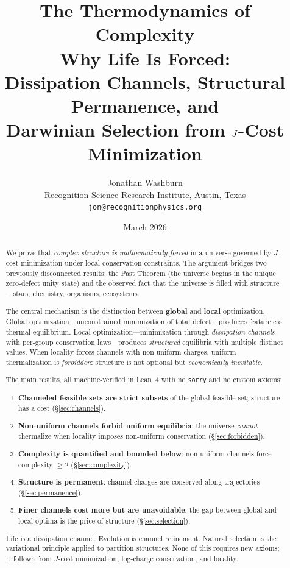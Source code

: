 \documentclass[11pt,a4paper]{article}
\title{\textbf{The Thermodynamics of Complexity}\\[0.3em]
\large Why Life Is Forced:\\
Dissipation Channels, Structural Permanence, and\\
Darwinian Selection from $\Jcost$-Cost Minimization}
\author{Jonathan Washburn\\
\small Recognition Science Research Institute, Austin, Texas\\
\small \texttt{jon@recognitionphysics.org}}
\date{March 2026}
\theoremstyle{plain}
\theoremstyle{definition}
\theoremstyle{remark}
\newcommand{\Jcost}{J}
\begin{document}
\maketitle

\begin{abstract}
We prove that \emph{complex structure is mathematically forced} in a universe governed by $\Jcost$-cost minimization under local conservation constraints.
The argument bridges two previously disconnected results: the Past Theorem (the universe begins in the unique zero-defect unity state) and the observed fact that the universe is filled with structure---stars, chemistry, organisms, ecosystems.

The central mechanism is the distinction between \textbf{global} and \textbf{local} optimization.
Global optimization---unconstrained minimization of total defect---produces featureless thermal equilibrium.
Local optimization---minimization through \emph{dissipation channels} with per-group conservation laws---produces \emph{structured} equilibria with multiple distinct values.
When locality forces channels with non-uniform charges, uniform thermalization is \emph{forbidden}: structure is not optional but \emph{economically inevitable}.

The main results, all machine-verified in Lean~4 with no \texttt{sorry} and no custom axioms:

\begin{enumerate}[nosep]
\item \textbf{Channeled feasible sets are strict subsets} of the global feasible set; structure has a cost (\S\ref{sec:channels}).
\item \textbf{Non-uniform channels forbid uniform equilibria}: the universe \emph{cannot} thermalize when locality imposes non-uniform conservation (\S\ref{sec:forbidden}).
\item \textbf{Complexity is quantified and bounded below}: non-uniform channels force complexity $\ge 2$ (\S\ref{sec:complexity}).
\item \textbf{Structure is permanent}: channel charges are conserved along trajectories (\S\ref{sec:permanence}).
\item \textbf{Finer channels cost more but are unavoidable}: the gap between global and local optima is the price of structure (\S\ref{sec:selection}).
\end{enumerate}

Life is a dissipation channel.
Evolution is channel refinement.
Natural selection is the variational principle applied to partition structures.
None of this requires new axioms; it follows from $\Jcost$-cost minimization, log-charge conservation, and locality.
\end{abstract}
\end{document}
